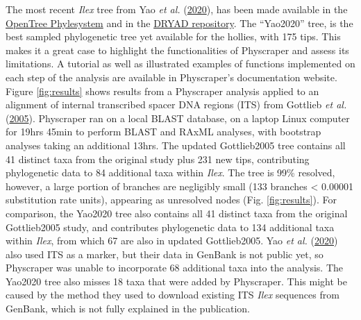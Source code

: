 \documentclass[]{article}
\begin{document}
The most recent \emph{Ilex} tree from Yao \emph{et al.} (\protect\hyperlink{ref-yao2020phylogeny}{2020}), has been made available in the \href{https://tree.opentreeoflife.org/curator/study/view/ot_1984}{OpenTree Phylesystem} and in the \href{https://datadryad.org/stash/dataset/doi:10.5061/dryad.k0p2ngf4x}{DRYAD repository}. The ``Yao2020'' tree, is the best sampled phylogenetic tree yet available for the hollies, with 175 tips.
This makes it a great case to highlight the functionalities of Physcraper and assess its limitations.
A tutorial as well as illustrated examples of functions implemented on each step of the analysis are available in Physcraper's documentation website.
Figure \ref{fig:results} shows results from a Physcraper analysis applied to an alignment of internal transcribed spacer DNA regions (ITS) from Gottlieb \emph{et al.} (\protect\hyperlink{ref-gottlieb2005molecular}{2005}). Physcraper ran on a local BLAST database, on a laptop Linux computer for 19hrs 45min to perform BLAST and RAxML analyses, with bootstrap analyses taking an additional 13hrs.
The updated Gottlieb2005 tree contains all 41 distinct taxa from the original study plus 231 new tips, contributing phylogenetic data to 84 additional taxa within \emph{Ilex}. The tree is 99\% resolved, however, a large portion of branches are negligibly small (133 branches \textless{} 0.00001 substitution rate units), appearing as unresolved nodes (Fig. \ref{fig:results}).
For comparison, the Yao2020 tree also contains all 41 distinct taxa from the original Gottlieb2005 study,
and contributes phylogenetic data to 134 additional taxa within \emph{Ilex}, from which
67 are also in updated Gottlieb2005. Yao \emph{et al.} (\protect\hyperlink{ref-yao2020phylogeny}{2020}) also used ITS as a marker, but their data in GenBank is not public yet, so Physcraper was unable to incorporate 68 additional taxa into the analysis. The Yao2020 tree also misses 18 taxa that were added by Physcraper. This might be caused by the method they used to download existing ITS \emph{Ilex} sequences from GenBank, which is not fully explained in the publication.
\end{document}

